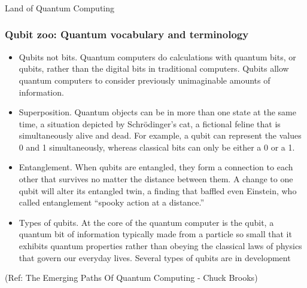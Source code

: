 \begin{frame}[fragile]\frametitle{}
\begin{center}
{\Large Land of Quantum Computing}
\end{center}
\end{frame}


 \begin{frame}[fragile]\frametitle{Qubit zoo: Quantum vocabulary and terminology}
\begin{itemize}
\item  Qubits not bits. Quantum computers do calculations with quantum bits, or qubits, rather than the digital bits in traditional computers. Qubits allow quantum computers to consider previously unimaginable amounts of information.

\item  Superposition. Quantum objects can be in more than one state at the same time, a situation depicted by Schrödinger’s cat, a fictional feline that is simultaneously alive and dead. For example, a qubit can represent the values 0 and 1 simultaneously, whereas classical bits can only be either a 0 or a 1.

\item  Entanglement. When qubits are entangled, they form a connection to each other that survives no matter the distance between them. A change to one qubit will alter its entangled twin, a finding that baffled even Einstein, who called entanglement “spooky action at a distance.”

\item  Types of qubits. At the core of the quantum computer is the qubit, a quantum bit of information typically made from a particle so small that it exhibits quantum properties rather than obeying the classical laws of physics that govern our everyday lives. Several types of qubits are in development
\end{itemize}

	
\tiny{(Ref: The Emerging Paths Of Quantum Computing - Chuck Brooks)}

\end{frame}

